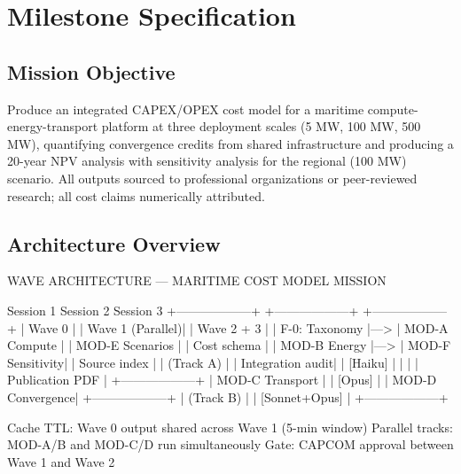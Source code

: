 \documentclass[11pt,letterpaper]{article}
\newcommand{\stageheader}[2]{%
  \noindent\colorbox{#2}{\makebox[\textwidth][l]{%
    \textcolor{white}{\bfseries\sffamily\hspace{6pt}#1\hspace{6pt}}}}%
  \vspace{0.5em}\par%
}
\begin{document}
\newpage
\stageheader{STAGE 3 --- MISSION PACKAGE}{tertiary}

\section{Milestone Specification}

\subsection{Mission Objective}

Produce an integrated CAPEX/OPEX cost model for a maritime compute-energy-transport
platform at three deployment scales (5 MW, 100 MW, 500 MW), quantifying convergence
credits from shared infrastructure and producing a 20-year NPV analysis with sensitivity
analysis for the regional (100 MW) scenario. All outputs sourced to professional
organizations or peer-reviewed research; all cost claims numerically attributed.

\subsection{Architecture Overview}

\begin{asciibox}
WAVE ARCHITECTURE --- MARITIME COST MODEL MISSION

  Session 1                Session 2                Session 3
  +------------------+     +------------------+     +------------------+
  | Wave 0           |     | Wave 1 (Parallel)|     | Wave 2 + 3       |
  | F-0: Taxonomy    |---> | MOD-A Compute    |     | MOD-E Scenarios  |
  | Cost schema      |     | MOD-B Energy     |---> | MOD-F Sensitivity|
  | Source index     |     | (Track A)        |     | Integration audit|
  | [Haiku]          |     |                  |     | Publication PDF  |
  +------------------+     | MOD-C Transport  |     | [Opus]           |
                           | MOD-D Convergence|     +------------------+
                           | (Track B)        |
                           | [Sonnet+Opus]    |
                           +------------------+

  Cache TTL: Wave 0 output shared across Wave 1 (5-min window)
  Parallel tracks: MOD-A/B and MOD-C/D run simultaneously
  Gate: CAPCOM approval between Wave 1 and Wave 2
\end{asciibox}
\end{document}
